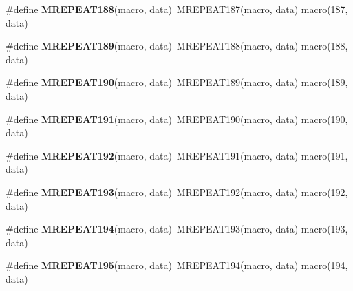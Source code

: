 \begin{DoxyCompactItemize}
\item 
\hypertarget{group__group__sam0__utils__mrepeat_ga58e111ce05110cc0fe761789c2ec761a}{}\#define {\bfseries M\+R\+E\+P\+E\+A\+T188}(macro,  data)~M\+R\+E\+P\+E\+A\+T187(macro, data)   macro(187, data)\label{group__group__sam0__utils__mrepeat_ga58e111ce05110cc0fe761789c2ec761a}

\item 
\hypertarget{group__group__sam0__utils__mrepeat_ga691dc645795e6f5cb2083e198a7af972}{}\#define {\bfseries M\+R\+E\+P\+E\+A\+T189}(macro,  data)~M\+R\+E\+P\+E\+A\+T188(macro, data)   macro(188, data)\label{group__group__sam0__utils__mrepeat_ga691dc645795e6f5cb2083e198a7af972}

\item 
\hypertarget{group__group__sam0__utils__mrepeat_ga90b2ca3e144e35ea7d3f1f757868cbab}{}\#define {\bfseries M\+R\+E\+P\+E\+A\+T190}(macro,  data)~M\+R\+E\+P\+E\+A\+T189(macro, data)   macro(189, data)\label{group__group__sam0__utils__mrepeat_ga90b2ca3e144e35ea7d3f1f757868cbab}

\item 
\hypertarget{group__group__sam0__utils__mrepeat_ga8914eac2b15fba3933b8bd800427a153}{}\#define {\bfseries M\+R\+E\+P\+E\+A\+T191}(macro,  data)~M\+R\+E\+P\+E\+A\+T190(macro, data)   macro(190, data)\label{group__group__sam0__utils__mrepeat_ga8914eac2b15fba3933b8bd800427a153}

\item 
\hypertarget{group__group__sam0__utils__mrepeat_ga409d357004e39610efaaad55f3325484}{}\#define {\bfseries M\+R\+E\+P\+E\+A\+T192}(macro,  data)~M\+R\+E\+P\+E\+A\+T191(macro, data)   macro(191, data)\label{group__group__sam0__utils__mrepeat_ga409d357004e39610efaaad55f3325484}

\item 
\hypertarget{group__group__sam0__utils__mrepeat_ga44cace8e364132f4472cb81dabb2e525}{}\#define {\bfseries M\+R\+E\+P\+E\+A\+T193}(macro,  data)~M\+R\+E\+P\+E\+A\+T192(macro, data)   macro(192, data)\label{group__group__sam0__utils__mrepeat_ga44cace8e364132f4472cb81dabb2e525}

\item 
\hypertarget{group__group__sam0__utils__mrepeat_gad99185ad8f1a4a6a5597cf80d2ef1453}{}\#define {\bfseries M\+R\+E\+P\+E\+A\+T194}(macro,  data)~M\+R\+E\+P\+E\+A\+T193(macro, data)   macro(193, data)\label{group__group__sam0__utils__mrepeat_gad99185ad8f1a4a6a5597cf80d2ef1453}

\item 
\hypertarget{group__group__sam0__utils__mrepeat_ga9b1f8ebc91ab6f86e156010f11811cfa}{}\#define {\bfseries M\+R\+E\+P\+E\+A\+T195}(macro,  data)~M\+R\+E\+P\+E\+A\+T194(macro, data)   macro(194, data)\label{group__group__sam0__utils__mrepeat_ga9b1f8ebc91ab6f86e156010f11811cfa}


\end{DoxyCompactItemize}
